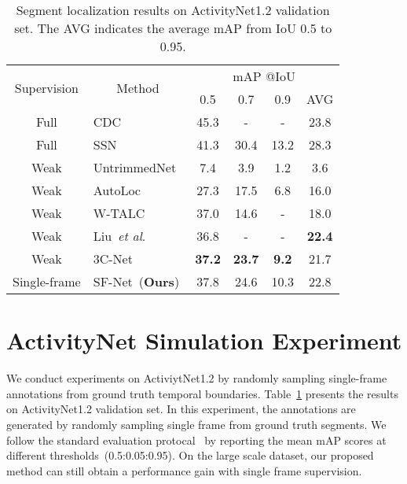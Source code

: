 \documentclass[runningheads]{llncs}
\def\etal{\emph{et al}.}
\begin{document}
	
\begin{table}[!t]
		\centering
		\footnotesize
		\setlength\extrarowheight{2pt}
		\begin{tabular}{c|l|cccc}
			\hline
			\multicolumn{1}{c|}{\multirow{2}{*}{Supervision}} & \multicolumn{1}{c|}{\multirow{2}{*}{Method}} & \multicolumn{4}{c}{mAP @IoU}                                  \\ \cline{3-6}
			\multicolumn{1}{c|}{}                               &                      & 0.5  & 0.7  & 0.9  & AVG   \\ \hline
			Full & CDC ~\cite{Shou_2017_CVPR}    &  45.3                     &					-         &   -       &      23.8   \\ 
			Full & SSN ~\cite{zhao2017temporal}    &  41.3                     &					30.4         &   13.2        &      28.3     \\ \hline
			Weak & UntrimmedNet~\cite{wang2017untrimmednets}     & 7.4      &   3.9    &    1.2       & 3.6  \\   
			Weak & AutoLoc~\cite{shou2018autoloc} &            	27.3			&		17.5			& 		6.8			& 	16.0				\\   
			Weak & W-TALC~\cite{ding2018weakly} &            	37.0		&		14.6	& 	-			& 	18.0				\\  
			Weak & Liu~\etal~\cite{Liu_2019_CVPR} &            	36.8		&		-	& 	-			& 	\textbf{22.4}				\\  
			Weak & 3C-Net~\cite{Narayan_2019_ICCV} &            	\textbf{37.2}		&		\textbf{23.7}	& 	\textbf{9.2}			& 	21.7				\\ \hline
			Single-frame & SF-Net~(\textbf{Ours}) &   		37.8	&		24.6			& 		10.3		& 		22.8		\\  \hline
		\end{tabular}
		\caption{Segment localization results on ActivityNet1.2 validation set. The AVG indicates the average mAP from IoU 0.5 to 0.95.}
		\label{tab:act12}
	\end{table}
	
	
	\section{ActivityNet Simulation Experiment}
	We conduct experiments on ActiviytNet1.2 by randomly sampling single-frame annotations from ground truth temporal boundaries. Table~\ref{tab:act12} presents the results on ActivityNet1.2 validation set. In this experiment, the annotations are generated by randomly sampling single frame from ground truth segments.
	We follow the standard evaluation protocal~\cite{caba2015activitynet} by reporting the mean mAP scores at different thresholds~(0.5:0.05:0.95).
	On the large scale dataset, our proposed method can still obtain a performance gain with single frame supervision. 
	
\end{document}
